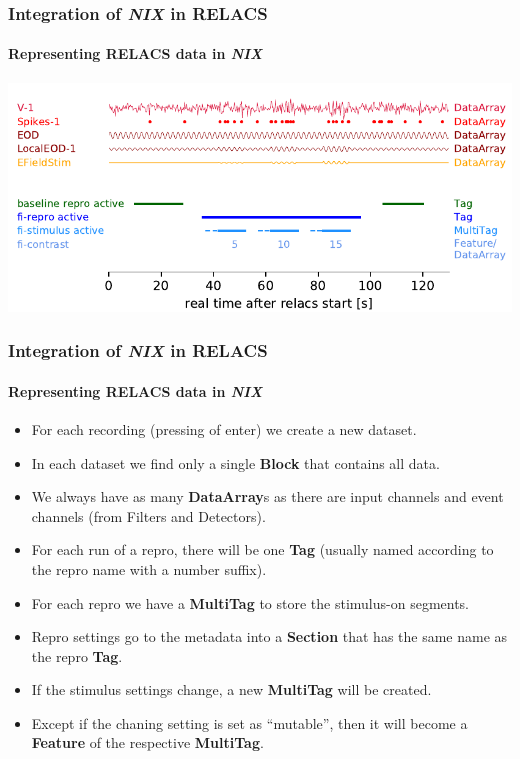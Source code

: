 \documentclass[pdftex, xcolor=table]{beamer}
\newcommand{\nix}{\textit{NIX}}
\newcommand{\dataarray}{\textbf{DataArray}}
\begin{document}
\begin{frame}
  \frametitle{Integration of \nix{} in RELACS}
  \framesubtitle{Representing RELACS data in \nix{}}
  \begin{center}
    \includegraphics[width=0.9\columnwidth]{images/relacs_tagging}
  \end{center}
\end{frame}

\begin{frame}
  \frametitle{Integration of \nix{} in RELACS}
  \framesubtitle{Representing RELACS data in \nix{}}
  \begin{itemize}
  \item For each recording (pressing of enter) we create a new dataset.
  \item In each dataset we find only a single \textbf{Block} that
    contains all data.
  \item We always have as many \dataarray{}s as there are input channels
    and event channels (from Filters and Detectors).
  \item For each run of a repro, there will be one \textbf{Tag}
    (usually named according to the repro name with a number suffix).
  \item For each repro we have a \textbf{MultiTag} to store the
    stimulus-on segments.
  \item Repro settings go to the metadata into a \textbf{Section} that
    has the same name as the repro \textbf{Tag}.
  \item If the stimulus settings change, a new \textbf{MultiTag} will be created.
  \item Except if the chaning setting is set as ``mutable'', then it
    will become a \textbf{Feature} of the respective
    \textbf{MultiTag}.
  \end{itemize}
\end{frame}
\end{document}
